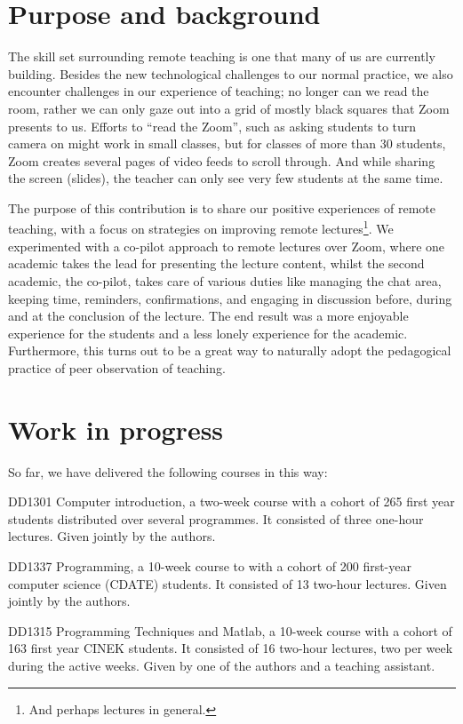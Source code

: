 \documentclass[sigconf]{acmart}
\begin{document}
\section*{Purpose and background}

The skill set surrounding remote teaching is one that many of us are currently 
building. Besides the new technological challenges to our normal practice, we 
also encounter challenges in our experience of teaching; no longer can we read 
the room, rather we can only gaze out into a grid of mostly black squares that 
Zoom presents to us.
Efforts to \enquote{read the Zoom}, such as asking students to turn camera on 
might work in small classes, but for classes of more than 30 students, Zoom 
creates several pages of video feeds to scroll through.
And while sharing the screen (\eg slides), the teacher can only see very few 
students at the same time.

The purpose of this contribution is to share our positive experiences of remote 
teaching, with a focus on strategies on improving remote lectures\footnote{%
  And perhaps lectures in general.
}.
We experimented with a co-pilot approach to remote lectures over Zoom, where 
one academic takes the lead for presenting the lecture content, whilst the 
second academic, the co-pilot, takes care of various duties like managing the 
chat area, keeping time, reminders, confirmations, and engaging in discussion 
before, during and at the conclusion of the lecture.
The end result was a more enjoyable experience for the students and a less 
lonely experience for the academic.
Furthermore, this turns out to be a great way to naturally adopt the 
pedagogical practice of peer observation of teaching.


\section*{Work in progress}

So far, we have delivered the following courses in this way:
\begin{courses}
  \item\label{datintro20} DD1301 Computer introduction, a two-week course with 
    a cohort of 265 first year students distributed over several programmes.
    It consisted of three one-hour lectures.
    Given jointly by the authors.

  \item\label{inda20} DD1337 Programming, a 10-week course to with a cohort of 
    200 first-year computer science (CDATE) students.
    It consisted of 13 two-hour lectures.
    Given jointly by the authors.

  \item\label{prgi20} DD1315 Programming Techniques and Matlab, a 10-week 
    course with a cohort of 163 first year CINEK students.
    It consisted of 16 two-hour lectures, two per week during the active weeks.
    Given by one of the authors and a teaching assistant.
\end{courses}
\end{document}
